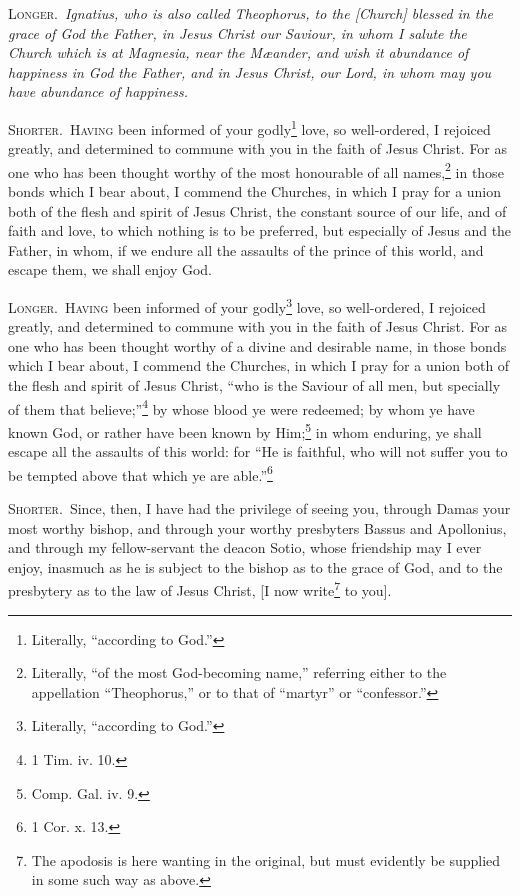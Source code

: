 \textsc{Longer.}~\emph{Ignatius, who is also called Theophorus, to the [Church] blessed in the grace of God the Father, in Jesus Christ our Saviour, in whom I salute the Church which is at Magnesia, near the Mæander, and wish it abundance of happiness in God the Father, and in Jesus Christ, our Lord, in whom may you have abundance of happiness.}


\textsc{Shorter.}~\textsc{Having} been informed of your godly\footnote{Literally, “according to God.”} love, so well-ordered, I rejoiced greatly, and determined to commune with you in the faith of Jesus Christ. For as one who has been thought worthy of the most honourable of all names,\footnote{Literally, “of the most God-becoming name,” referring either to the appellation “Theophorus,” or to that of “martyr” or “confessor.”} in those bonds which I bear about, I commend the Churches, in which I pray for a union both of the flesh and spirit of Jesus Christ, the constant source of our life, and of faith and love, to which nothing is to be preferred, but especially of Jesus and the Father, in whom, if we endure all the assaults of the prince of this world, and escape them, we shall enjoy God.

\textsc{Longer.}~\textsc{Having} been informed of your godly\footnote{Literally, “according to God.”} love, so well-ordered, I rejoiced greatly, and determined to commune with you in the faith of Jesus Christ. For as one who has been thought worthy of a divine and desirable name, in those bonds which I bear about, I commend the Churches, in which I pray for a union both of the flesh and spirit of Jesus Christ, “who is the Saviour of all men, but specially of them that believe;”\footnote{1 Tim. iv. 10.} by whose blood ye were redeemed; by whom ye have known God, or rather have been known by Him;\footnote{Comp. Gal. iv. 9.} in whom enduring, ye shall escape all the assaults of this world: for “He is faithful, who will not suffer you to be tempted above that which ye are able.”\footnote{1 Cor. x. 13.}


\textsc{Shorter.}~Since, then, I have had the privilege of seeing you, through Damas your most worthy bishop, and through your worthy presbyters Bassus and Apollonius, and through my fellow-servant the deacon Sotio, whose friendship may I ever enjoy, inasmuch as he is subject to the bishop as to the grace of God, and to the presbytery as to the law of Jesus Christ, [I now write\footnote{The apodosis is here wanting in the original, but must evidently be supplied in some such way as above.} to you].


